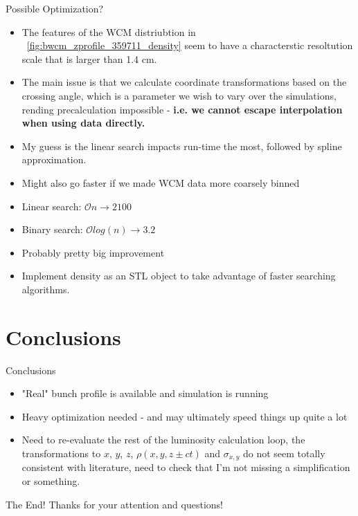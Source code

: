 \begin{frame}{Possible Optimization?}
\begin{itemize}
\item The features of the WCM distriubtion in
	~\ref{fig:bwcm_zprofile_359711_density} seem to have a characterstic
	resoltution scale that is larger than 1.4 cm.
\item The main issue is that we calculate coordinate transformations based on
	the crossing angle, which is a parameter we wish to vary over the
	simulations, rending precalculation impossible - \textbf{i.e. we cannot
	escape interpolation when using data directly.}
\item My guess is the linear search impacts run-time the most, followed by
	spline approximation.
\item Might also go faster if we made WCM data more coarsely binned
\item Linear search: $\mathcal{O}n \rightarrow 2100$
\item Binary search: $\mathcal{O}log(n) \rightarrow 3.2$ 
\item Probably pretty big improvement
\item Implement density as an STL object to take advantage of faster searching
	algorithms.
\end{itemize}
\end{frame}

\section{Conclusions}

\begin{frame} {Conclusions}
\begin{itemize}
\item "Real" bunch profile is available and simulation is running
\item Heavy optimization needed - and may ultimately speed things up quite a lot
\item Need to re-evaluate the rest of the luminosity calculation loop, the
transformations to $x$, $y$, $z$, $\rho(x,y,z\pm ct)$ and $\sigma_{x,y}$ do not
seem totally consistent with literature, need to check that I'm not missing a
simplification or something.
\end{itemize}
\end{frame}

\begin{frame}{The End!}
Thanks for your attention and questions!
\end{frame}
